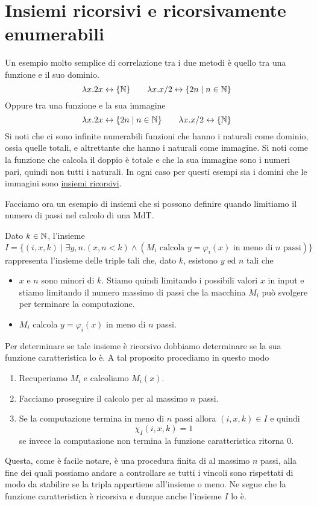 \section{Insiemi ricorsivi e ricorsivamente enumerabili}
Un esempio molto semplice di correlazione tra i due metodi è
quello tra una funzione e il suo dominio.
\[
	\lambda x . 2 x \leftrightarrow \{ \mathbb{N} \} \qquad
	\lambda x . x / 2 \leftrightarrow \{ 2n \mid n \in \mathbb{N} \}
\]
Oppure tra una funzione e la sua immagine
\[
	\lambda x . 2 x \leftrightarrow \{ 2 n \mid n \in \mathbb{N} \}
	\qquad \lambda x . x / 2 \leftrightarrow \{ \mathbb{N} \}
\]
Si noti che ci sono infinite numerabili funzioni che hanno i
naturali come dominio, ossia quelle totali, e altrettante che
hanno i naturali come immagine. Si noti come la funzione che
calcola il doppio è totale e che la sua immagine sono i numeri
pari, quindi non tutti i naturali. In ogni caso per questi
esempi sia i domini che le immagini sono
\hyperref[def: relazione ricorsiva]{insiemi ricorsivi}.

Facciamo ora un esempio di insiemi che si possono definire
quando limitiamo il numero di passi nel calcolo di una MdT.

\begin{example}
	Dato $k \in \mathbb{N}$, l'insieme
	\[
		I = \{ (i, x, k) \mid \exists y, n . (x, n < k)
		\land (M_i \text{ calcola } y = \varphi_i (x)
		\text{ in meno di } n \text{ passi}) \}
	\]
	rappresenta l'insieme delle triple tali che, dato $k$,
	esistono $y$ ed $n$ tali che
	\begin{itemize}
		\item $x$ e $n$ sono minori di $k$. Stiamo quindi
		      limitando i possibili valori $x$ in input e stiamo
		      limitando il numero massimo di passi che la
		      macchina $M_i$ può svolgere per terminare la
		      computazione.
		\item $M_i$ calcola $y = \varphi_i (x)$ in meno di $n$
		      passi.
	\end{itemize}
	Per determinare se tale insieme è ricorsivo dobbiamo
	determinare se la sua funzione caratteristica lo è. A tal
	proposito procediamo in questo modo
	\begin{enumerate}
		\item Recuperiamo $M_i$ e calcoliamo $M_i(x)$.
		\item Facciamo proseguire il calcolo per al massimo $n$
		      passi.
		\item Se la computazione termina in meno di $n$ passi
		      allora $(i, x, k) \in I$ e quindi
		      \[ \chi_I (i, x, k) = 1 \]
		      se invece la computazione non termina la funzione
		      caratteristica ritorna $0$.
	\end{enumerate}
	Questa, come è facile notare, è una procedura finita di al
	massimo $n$ passi, alla fine dei quali possiamo andare a
	controllare se tutti i vincoli sono rispettati di modo da
	stabilire se la tripla appartiene all'insieme o meno. Ne
	segue che la funzione caratteristica è ricorsiva e dunque
	anche l'insieme $I$ lo è.
\end{example}

